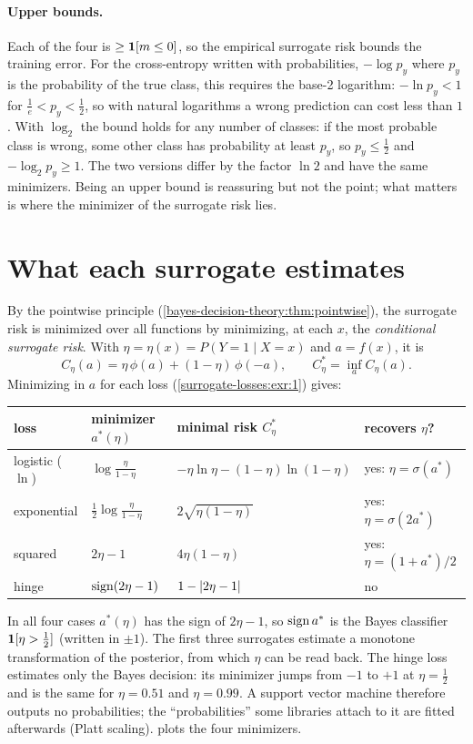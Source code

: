 \begin{notechapter}
\paragraph{Upper bounds.} Each of the four is $\geq\mathbf{1}[m\leq0]$, so the empirical surrogate
risk bounds the training error. For the cross-entropy written with probabilities,
$-\log p_y$ where $p_y$ is the probability of the true class, this requires the base-2
logarithm: $-\ln p_y<1$ for $\frac1e<p_y<\frac12$, so with natural logarithms a wrong
prediction can cost less than $1$. With $\log_2$ the bound holds for any number of
classes: if the most probable class is wrong, some other class has probability at
least $p_y$, so $p_y\leq\frac12$ and $-\log_2p_y\geq1$. The two versions differ by the factor $\ln2$
and have the same minimizers. Being an upper bound is reassuring but not the
point; what matters is where the minimizer of the surrogate risk lies.

\section{What each surrogate estimates}\label{surrogate-losses:sec:conditional}

By the pointwise principle (\cref{bayes-decision-theory:thm:pointwise}), the surrogate risk is
minimized over all functions by minimizing, at each $x$, the \emph{conditional
surrogate risk}. With $\eta = \eta(x) = P(Y = 1\mid X = x)$ and $a = f(x)$, it is
\[
  C_\eta(a) = \eta\,\phi(a) + (1 - \eta)\,\phi(-a),\qquad
  C^*_\eta = \inf_aC_\eta(a).
\]
Minimizing in $a$ for each loss (\cref{surrogate-losses:exr:1}) gives:
\begin{center}
\begin{tabular}{@{}llll@{}}
\toprule
loss & minimizer $a^*(\eta)$ & minimal risk $C^*_\eta$ & recovers $\eta$? \\
\midrule
logistic ($\ln$) & $\log\frac\eta{1 - \eta}$ & $-\eta\ln\eta - (1 - \eta)\ln(1 - \eta)$ & yes: $\eta = \sigma(a^*)$ \\
exponential & $\frac12\log\frac\eta{1 - \eta}$ & $2\sqrt{\eta(1 - \eta)}$ & yes: $\eta = \sigma(2a^*)$ \\
squared & $2\eta - 1$ & $4\eta(1 - \eta)$ & yes: $\eta = (1 + a^*)/2$ \\
hinge & $\operatorname{sign}(2\eta - 1)$ & $1 - \left|2\eta - 1\right|$ & no \\
\bottomrule
\end{tabular}
\end{center}
In all four cases $a^*(\eta)$ has the sign of $2\eta - 1$, so $\operatorname{sign} a^*$ is the Bayes classifier
$\mathbf{1}[\eta>\frac12]$ (written in $\pm1$). The first three surrogates estimate a monotone
transformation of the posterior, from which $\eta$ can be read back. The hinge loss
estimates only the Bayes decision: its minimizer jumps from $-1$ to $+1$ at $\eta = \frac12$ and
is the same for $\eta = 0.51$ and $\eta = 0.99$. A support vector machine therefore outputs no
probabilities; the ``probabilities'' some libraries attach to it are fitted
afterwards (Platt scaling).  plots the four minimizers.


\end{notechapter}
